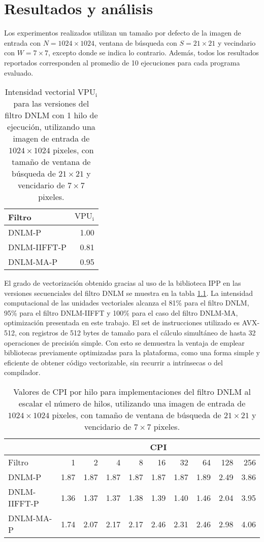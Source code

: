 \chapter{Resultados y análisis}
\label{ch:res}

Los experimentos realizados utilizan un tama\~no por defecto de la imagen de entrada con $N = 1024 \times 1024$, ventana de búsqueda con $S = 21 \times 21$ y vecindario con $W = 7 \times 7$, excepto donde se indica lo contrario. Adem\'as, todos los resultados reportados corresponden al promedio de 10 ejecuciones para cada programa evaluado.  

\begin{table}[htb]
\centering
\caption[Intensidad vectorial de operaciones con un hilo de ejecución]{Intensidad vectorial  $\text{VPU}_{\text{i}}$ para las versiones del filtro DNLM con 1 hilo de ejecución, utilizando una imagen de entrada de $1024 \times 1024$ pixeles, con tama\~no de ventana de búsqueda de $21 \times 21$ y vencidario de $7 \times 7$ pixeles. \label{tabla:vpui}}
\begin{tabular}{lr}
 Filtro & $\text{VPU}_{\text{i}}$ \tabularnewline
\hline
DNLM-P & 1.00 \tabularnewline
DNLM-IIFFT-P & 0.81 \tabularnewline
DNLM-MA-P & 0.95 \tabularnewline
\end{tabular}
\end{table}

El grado de vectorizaci\'on obtenido gracias al uso de la biblioteca IPP en las versiones secuenciales del filtro DNLM se muestra en la tabla \ref{tabla:vpui}. La intensidad computacional de las unidades vectoriales alcanza el 81\% para el filtro DNLM, 95\% para el filtro DNLM-IIFFT y 100\% para el caso del filtro DNLM-MA, optimizaci\'on presentada en este trabajo. El set de instrucciones utilizado es AVX-512, con registros de 512 bytes de tama\~no para el c\'alculo simult\'aneo de hasta 32 operaciones de precisi\'on simple. Con esto se demuestra la ventaja de emplear bibliotecas previamente optimizadas para la plataforma, como una forma simple y eficiente de obtener c\'odigo vectorizable, sin recurrir a intr\'insecas o  del compilador.


\begin{table}[bht]
\centering
\caption[Cambio en CPI al escalar el n\'umero de hilos]{Valores de CPI por hilo para implementaciones del filtro DNLM al escalar el n\'umero de hilos, utilizando una imagen de entrada de $1024 \times 1024$ pixeles, con tama\~no de ventana de búsqueda de $21 \times 21$ y vencidario de $7 \times 7$ pixeles. \label{tabla:cpi}}
\begin{tabular}{lrrrrrrrrr}
& \multicolumn{9}{c}{CPI} \tabularnewline
\hline
 Filtro & 1 & 2 & 4 & 8 & 16 & 32 & 64 & 128 & 256 \tabularnewline
\hline
DNLM-P & 1.87 & 1.87 & 1.87 & 1.87 & 1.87 & 1.87 & 1.89 & 2.49 & 3.86 \tabularnewline
DNLM-IIFFT-P & 1.36 & 1.37 & 1.37 & 1.38 & 1.39 & 1.40 & 1.46 & 2.04 & 3.95 \tabularnewline
DNLM-MA-P & 1.74 & 2.07 & 2.17 & 2.17 & 2.46 & 2.31 & 2.46 & 2.98 & 4.06 \tabularnewline
\end{tabular}
\end{table}


